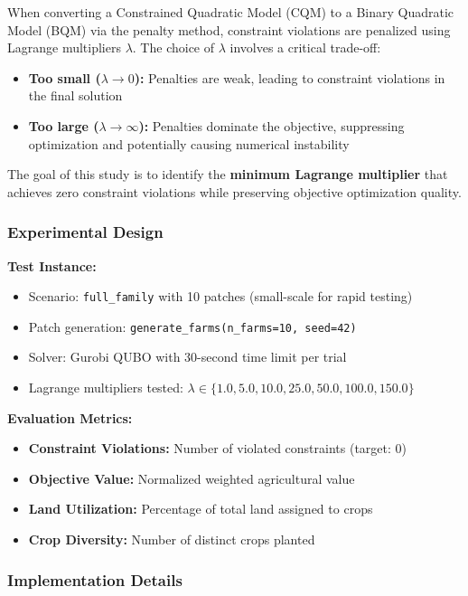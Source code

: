 \documentclass{oqireport}
\begin{document}
When converting a Constrained Quadratic Model (CQM) to a Binary Quadratic Model (BQM) via the penalty method, constraint violations are penalized using Lagrange multipliers $\lambda$. The choice of $\lambda$ involves a critical trade-off:

\begin{itemize}
    \item \textbf{Too small ($\lambda \to 0$):} Penalties are weak, leading to constraint violations in the final solution
    \item \textbf{Too large ($\lambda \to \infty$):} Penalties dominate the objective, suppressing optimization and potentially causing numerical instability
\end{itemize}

The goal of this study is to identify the \textbf{minimum Lagrange multiplier} that achieves zero constraint violations while preserving objective optimization quality.

\subsubsection{Experimental Design}

\textbf{Test Instance:}
\begin{itemize}
    \item Scenario: \texttt{full\_family} with 10 patches (small-scale for rapid testing)
    \item Patch generation: \texttt{generate\_farms(n\_farms=10, seed=42)}
    \item Solver: Gurobi QUBO with 30-second time limit per trial
    \item Lagrange multipliers tested: $\lambda \in \{1.0, 5.0, 10.0, 25.0, 50.0, 100.0, 150.0\}$
\end{itemize}

\textbf{Evaluation Metrics:}
\begin{itemize}
    \item \textbf{Constraint Violations:} Number of violated constraints (target: 0)
    \item \textbf{Objective Value:} Normalized weighted agricultural value
    \item \textbf{Land Utilization:} Percentage of total land assigned to crops
    \item \textbf{Crop Diversity:} Number of distinct crops planted
\end{itemize}

\subsubsection{Implementation Details}
\end{document}
